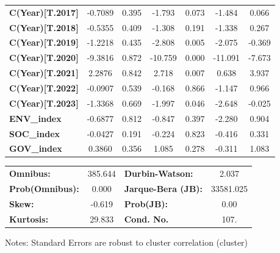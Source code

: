 \begin{center}
\begin{tabular}{lcccccc}
\textbf{C(Year)[T.2017]}         &      -0.7089  &        0.395     &    -1.793  &         0.073        &       -1.484    &        0.066     \\
\textbf{C(Year)[T.2018]}         &      -0.5355  &        0.409     &    -1.308  &         0.191        &       -1.338    &        0.267     \\
\textbf{C(Year)[T.2019]}         &      -1.2218  &        0.435     &    -2.808  &         0.005        &       -2.075    &       -0.369     \\
\textbf{C(Year)[T.2020]}         &      -9.3816  &        0.872     &   -10.759  &         0.000        &      -11.091    &       -7.673     \\
\textbf{C(Year)[T.2021]}         &       2.2876  &        0.842     &     2.718  &         0.007        &        0.638    &        3.937     \\
\textbf{C(Year)[T.2022]}         &      -0.0907  &        0.539     &    -0.168  &         0.866        &       -1.147    &        0.966     \\
\textbf{C(Year)[T.2023]}         &      -1.3368  &        0.669     &    -1.997  &         0.046        &       -2.648    &       -0.025     \\
\textbf{ENV\_index}              &      -0.6877  &        0.812     &    -0.847  &         0.397        &       -2.280    &        0.904     \\
\textbf{SOC\_index}              &      -0.0427  &        0.191     &    -0.224  &         0.823        &       -0.416    &        0.331     \\
\textbf{GOV\_index}              &       0.3860  &        0.356     &     1.085  &         0.278        &       -0.311    &        1.083     \\
\bottomrule
\end{tabular}
\begin{tabular}{lclc}
\textbf{Omnibus:}       & 385.644 & \textbf{  Durbin-Watson:     } &     2.037  \\
\textbf{Prob(Omnibus):} &   0.000 & \textbf{  Jarque-Bera (JB):  } & 33581.025  \\
\textbf{Skew:}          &  -0.619 & \textbf{  Prob(JB):          } &      0.00  \\
\textbf{Kurtosis:}      &  29.833 & \textbf{  Cond. No.          } &      107.  \\
\bottomrule
\end{tabular}
\end{center}

Notes: \newline
 [1] Standard Errors are robust to cluster correlation (cluster)